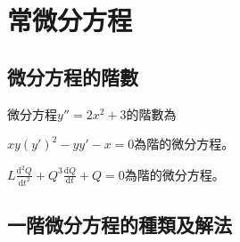 \documentclass[12pt, addpoints]{exam}
\def \d{\mathrm{d}}
\begin{document}
\begin{questions}

\end{questions}

\newpage %

\section{常微分方程}

\subsection{微分方程的階數}

\begin{questions}

\question[1]
微分方程$y''=2x^2+3$的階數為
\begin{choices}
\end{choices}

\question[1]
$xy(y')^2-yy'-x=0$為\fillin[Blank]階的微分方程。

\question[1]
$\displaystyle L \frac{\d^2 Q}{\d t^2} +Q^3 \frac{\d Q}{\d t} +Q=0$為\fillin[Blank]階的微分方程。
    
\end{questions}

\newpage %

\subsection{一階微分方程的種類及解法}
\end{document}
